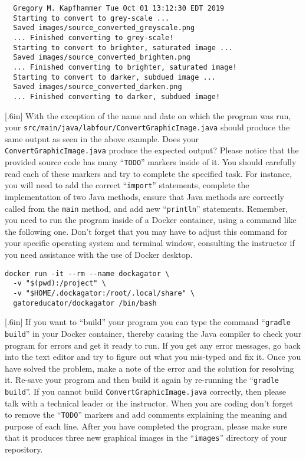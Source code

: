 \documentclass[11pt]{article}
\newcommand{\mainprogram}{\lstinline{ConvertGraphicImage.java}}
\newcommand{\mainprogramsource}{\lstinline{src/main/java/labfour/ConvertGraphicImage.java}}
\newcommand{\gradlebuild}{\command{gradle build}}
\newcommand{\command}[1]{``\lstinline{#1}''}
\newcommand{\program}[1]{\lstinline{#1}}
\newcommand{\step}[1]{``{#1}''}
\newcommand{\caution}[1]{\null\hfill\LARGE{\faWarning{}}\newline\scriptsize{\em{#1}}}
\begin{document}
\begin{verbatim}
  Gregory M. Kapfhammer Tue Oct 01 13:12:30 EDT 2019
  Starting to convert to grey-scale ...
  Saved images/source_converted_greyscale.png
  ... Finished converting to grey-scale!
  Starting to convert to brighter, saturated image ...
  Saved images/source_converted_brighten.png
  ... Finished converting to brighter, saturated image!
  Starting to convert to darker, subdued image ...
  Saved images/source_converted_darken.png
  ... Finished converting to darker, subdued image!
\end{verbatim}

\marginnote{\caution{Add missing source code}}[.6in] With the exception of the
name and date on which the program was run, your \mainprogramsource{} should
produce the same output as seen in the above example. Does your \mainprogram{}
produce the expected output?
%
Please notice that the provided source code has many \command{TODO} markers
inside of it. You should carefully read each of these markers and try to
complete the specified task. For instance, you will need to add the correct
\command{import} statements, complete the implementation of two Java methods,
ensure that Java methods are correctly called from the \program{main} method,
and add new \command{println} statements.
%
Remember, you need to run the program inside of a Docker container, using a
command like the following one. Don't forget that you may have to adjust this
command for your specific operating system and terminal window, consulting the
instructor if you need assistance with the use of Docker desktop.

\begin{verbatim}
docker run -it --rm --name dockagator \
  -v "$(pwd):/project" \
  -v "$HOME/.dockagator:/root/.local/share" \
  gatoreducator/dockagator /bin/bash
\end{verbatim}

\marginnote{\caution{Produce graphical images}}[.6in] If you want to \step{build}
your program you can type the command \gradlebuild{} in your Docker container,
thereby causing the Java compiler to check your program for errors and get it
ready to run. If you get any error messages, go back into the text editor and
try to figure out what you mis-typed and fix it. Once you have solved the
problem, make a note of the error and the solution for resolving it. Re-save
your program and then build it again by re-running the \gradlebuild{}. If you
cannot build \mainprogram{} correctly, then please talk with a technical leader
or the instructor. When you are coding don't forget to remove the \command{TODO}
markers and add comments explaining the meaning and purpose of each line. After
you have completed the program, please make sure that it produces three new
graphical images in the \command{images} directory of your repository.
\end{document}
